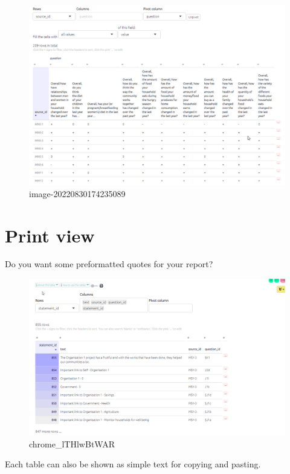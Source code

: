 \documentclass[
]{book}
\begin{document}
\begin{figure}
\centering
\includegraphics{_assets/image-20220830174235089.png}
\caption{image-20220830174235089}
\end{figure}

\hypertarget{xprint-view-tables}{%
\section{Print view}\label{xprint-view-tables}}

Do you want some preformatted quotes for your report?

\begin{figure}
\centering
\includegraphics[width=6.77083in,height=\textheight]{_assets/chrome_lTHlwBtWAR.gif}
\caption{chrome\_lTHlwBtWAR}
\end{figure}

Each table can also be shown as simple text for copying and pasting.
\end{document}
